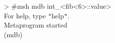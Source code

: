 
\begin{tttenv}
> \#msh mdb int\_<fib<6>::value> \\
For help, type \texttt{"}help\texttt{"}. \\
Metaprogram started \\
(mdb)
\end{tttenv}

